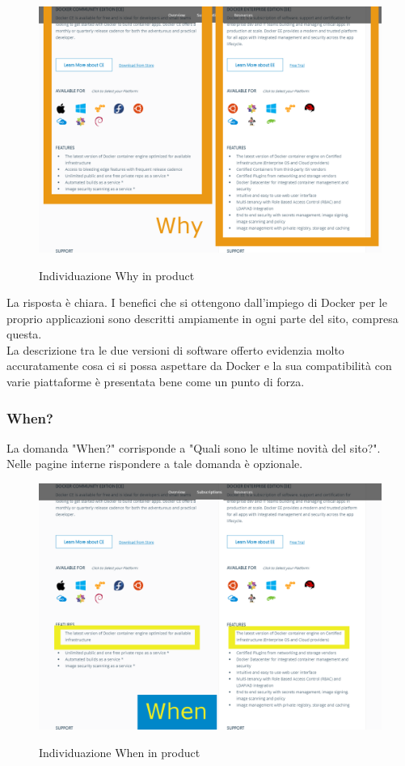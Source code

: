 \documentclass[a4paper]{article}
\begin{document}
\begin{figure}[H]
	\centering
	\includegraphics[width=\linewidth]{images/productwhy2.png}
    \label{fig:productwhy2}
    \caption{Individuazione Why in product}
\end{figure}

\noindent La risposta è chiara. I benefici che si ottengono dall'impiego di Docker per le proprio applicazioni sono descritti ampiamente in ogni parte del sito, compresa questa.
\\
La descrizione tra le due versioni di software offerto evidenzia molto accuratamente cosa ci si possa aspettare da Docker e la sua compatibilità con varie piattaforme è presentata bene come un punto di forza.

\subsubsection{When?}
La domanda "When?" corrisponde a "Quali sono le ultime novità del sito?".
\\
Nelle pagine interne rispondere a tale domanda è opzionale.

\begin{figure}[H]
	\centering
	\includegraphics[width=\linewidth]{images/productwhen.png}
    \label{fig:productwhen}
    \caption{Individuazione When in product}
\end{figure}
\end{document}
